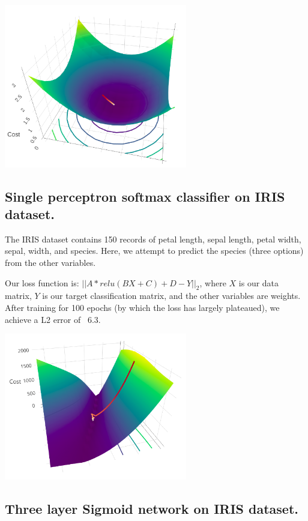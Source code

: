 \documentclass[letterpaper]{article}
\begin{document}
\begin{center}
    \includegraphics[width=8cm]{simple-bowl.png}
\end{center}

\subsection{Single perceptron softmax classifier on IRIS dataset.}
The IRIS dataset contains 150 records of petal length, sepal length, petal width, sepal, width, and species.  Here, we attempt to predict the species (three options) from the other variables.

Our loss function is: $||A*relu(BX + C) + D - Y||_2$, where $X$ is our data matrix, $Y$ is our target classification matrix, and the other variables are weights. After training for 100 epochs (by which the loss has largely plateaued), we achieve a L2 error of ~6.3.\\

\begin{center}
    \includegraphics[width=8cm]{single-percepton-iris.png}
\end{center}

\subsection{Three layer Sigmoid network on IRIS dataset.}
\end{document}
